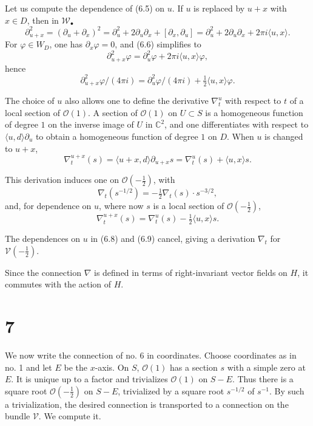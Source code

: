 \documentclass[12pt,a4paper]{article}
\theoremstyle{plain}
\theoremstyle{definition}
\theoremstyle{remark}
\begin{document}
Let us compute the dependence of (6.5) on $u$. If $u$ is replaced by $u+x$ with $x\in D$, then in $\mathscr W_\bullet$
\begin{equation}\label{eq:6.6}
\partial_{u+x}^2=(\partial_u+\partial_x)^2=\partial_u^2+2\partial_u\partial_x+[\partial_x,\partial_u]
=\partial_u^2+2\partial_u\partial_x+2\pi i\langle u,x\rangle.\tag{6.6}
\end{equation}
For $\varphi\in W_D$, one has $\partial_x\varphi=0$, and (6.6) simplifies to
\begin{equation}\label{eq:6.7}
\partial_{u+x}^2\varphi=\partial_u^2\varphi+2\pi i\langle u,x\rangle\varphi,\tag{6.7}
\end{equation}
hence
\begin{equation}\label{eq:6.8}
\partial_{u+x}^2\varphi/(4\pi i)=\partial_u^2\varphi/(4\pi i)+\tfrac12\langle u,x\rangle\varphi.\tag{6.8}
\end{equation}

The choice of $u$ also allows one to define the derivative $\nabla_t^u$ with respect to $t$ of a local section of $\mathcal O(1)$. A section of $\mathcal O(1)$ on $U\subset S$ is a homogeneous function of degree $1$ on the inverse image of $U$ in $\mathbb C^2$, and one differentiates with respect to $\langle u,d\rangle\partial_u$ to obtain a homogeneous function of degree $1$ on $D$. When $u$ is changed to $u+x$,
\[
\nabla_t^{u+x}(s)=\langle u+x,d\rangle\partial_{u+x}s=\nabla_t^u(s)+\langle u,x\rangle s.
\]

This derivation induces one on $\mathcal O(-\frac12)$, with
\[
\nabla_t(s^{-1/2})=-\tfrac12\nabla_t(s)\cdot s^{-3/2},
\]
and, for dependence on $u$, where now $s$ is a local section of $\mathcal O(-\frac12)$,
\begin{equation}\label{eq:6.9}
\nabla_t^{u+x}(s)=\nabla_t^u(s)-\tfrac12\langle u,x\rangle s.\tag{6.9}
\end{equation}

The dependences on $u$ in (6.8) and (6.9) cancel, giving a derivation $\nabla_t$ for $\mathscr V(-\frac12)$.

Since the connection $\nabla$ is defined in terms of right-invariant vector fields on $H$, it commutes with the action of $H$.

\section*{7}

We now write the connection of no. 6 in coordinates. Choose coordinates as in no. 1 and let $E$ be the $x$-axis. On $S$, $\mathcal O(1)$ has a section $s$ with a simple zero at $E$. It is unique up to a factor and trivializes $\mathcal O(1)$ on $S-E$. Thus there is a square root $\mathcal O(-\frac12)$ on $S-E$, trivialized by a square root $s^{-1/2}$ of $s^{-1}$. By such a trivialization, the desired connection is transported to a connection on the bundle $\mathscr V$. We compute it.
\end{document}
